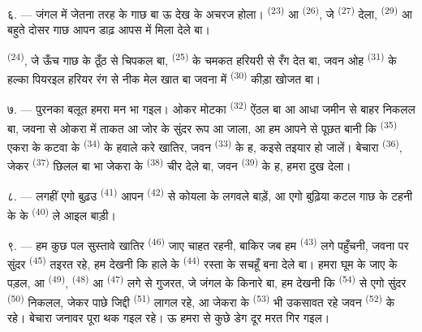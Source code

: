 ६. --- जंगल में जेतना तरह के गाछ बा ऊ देख के अचरज होला।  \textsuperscript{(23)} आ  \textsuperscript{(26)},
 जे  \textsuperscript{(27)} देला, 
\textsuperscript{(29)} आ बहुते दोसर गाछ आपन डाढ़ आपस में मिला देले बा।

 \textsuperscript{(24)}, जे ऊँच गाछ के ठूँठ से चिपकल बा,
 \textsuperscript{(25)} के चमकत हरियरी से रँग देत बा, जवन ओह
 \textsuperscript{(31)} के हल्का पियरइल हरियर रंग से नीक मेल
खात बा जवना में  \textsuperscript{(30)} कीड़ा खोजत बा।

\VUsaut{3.0mm}
\VUsaut{3.0mm}

७. --- पुरनका बलूत हमरा मन भा गइल। ओकर मोटका 
\textsuperscript{(32)} ऐंठल बा आ आधा जमीन से बाहर निकलल बा, जवना से ओकरा
में ताकत आ जोर के सुंदर रूप आ जाला, आ हम आपने से पूछत बानी कि
 \textsuperscript{(35)} एकरा के कटवा के 
\textsuperscript{(34)} के हवाले करे खातिर, जवन 
\textsuperscript{(33)} के ह, कइसे तइयार हो जालें। बेचारा  \textsuperscript{(36)},
जेकर  \textsuperscript{(37)} छिलल बा भा जेकरा के
 \textsuperscript{(38)} चीर देले बा, जवन  \textsuperscript{(39)} के ह, हमरा दुख देला।

८. --- लगहीं एगो बुढ़उ  \textsuperscript{(41)}
आपन  \textsuperscript{(42)} से कोयला के  लगवले
बाड़ें, आ एगो बुढ़िया कटल गाछ के टहनी के  के
 \textsuperscript{(40)} ले आइल बाड़ी।

\VUsaut{3.0mm}
\VUsaut{3.0mm}

९. --- हम कुछ पल सुस्तावे खातिर  \textsuperscript{(46)}
जाए चाहत रहनी, बाकिर जब हम  \textsuperscript{(43)} लगे
पहुँचनी, जवना पर सुंदर  \textsuperscript{(45)} तइरत रहे,
हम देखनी कि हाले के  \textsuperscript{(44)} रस्ता के सचहूँ
 बना देले बा। हमरा घूम के जाए के पड़ल, आ 
\textsuperscript{(49)},  \textsuperscript{(48)} आ
 \textsuperscript{(47)} लगे से गुजरत, जे जंगल के किनारे बा,
हम देखनी कि  \textsuperscript{(54)} से एगो सुंदर
 \textsuperscript{(50)} निकलल, जेकर पाछे जिद्दी
 \textsuperscript{(51)} लागल रहे, आ जेकरा के
 \textsuperscript{(53)} भी उकसावत रहे जवन
 \textsuperscript{(52)} के रहे। बेचारा जनावर पूरा
थक गइल रहे। ऊ हमरा से कुछे डेग दूर मरत गिर गइल।

